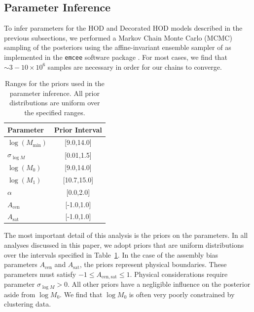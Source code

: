 \documentclass[usenatbib,usegraphicx,letterpaper]{mn2e}
\begin{document}
\subsection{Parameter Inference}
\label{subsection:mcmc}

To infer parameters for the HOD and Decorated HOD models described in the previous subsections, 
we performed a Markov Chain Monte Carlo (MCMC) sampling of the posteriors using the 
affine-invariant ensemble sampler of \citet{goodman_weare10} as implemented in the 
{\tt emcee} software package \citep{foreman-mackey_etal13}. For most cases, we find that 
$\sim 3-10 \times 10^{6}$ samples are necessary in order for our chains to converge. 


\begin{table}
\begin{center}
{\renewcommand{\arraystretch}{1.3}
\renewcommand{\tabcolsep}{0.2cm}
\begin{tabular}{l c}
\hline 
\hline
Parameter & Prior Interval\\ 
\hline
$\log (M_{\mathrm{min}})$ & [9.0,14.0] \\
$\sigma_{\log M}$ & [0.01,1.5] \\
$\log (M_0)$ & [9.0,14.0]\\
$\log (M_1)$ & [10.7,15.0]\\
$\alpha$ & [0.0,2.0]\\
$A_{\mathrm{cen}}$ & [-1.0,1.0]\\
$A_{\mathrm{sat}}$ & [-1.0,1.0]\\
\hline
\end{tabular}
\medskip
\caption{
Ranges for the priors used in the parameter inference. All prior distributions are uniform over the 
specified ranges.}
 }
 \label{table:priors}
 \end{center}
\end{table}


The most important detail of this analysis is the priors on the parameters. In all analyses 
discussed in this paper, we adopt priors that are uniform distributions over the intervals 
specified in Table~\ref{table:priors}. In the case of the assembly bias parameters 
$A_{\mathrm{cen}}$ and $A_{\mathrm{sat}}$, the priors represent physical 
boundaries. These parameters must satisfy $-1 \le A_{\mathrm{cen,sat}} \le 1$. 
Physical considerations require parameter $\sigma_{\log M} > 0$. All other 
priors have a negligible influence on the posterior aside from $\log M_0$. 
We find that $\log M_0$ is often very poorly constrained by clustering data.
\end{document}
